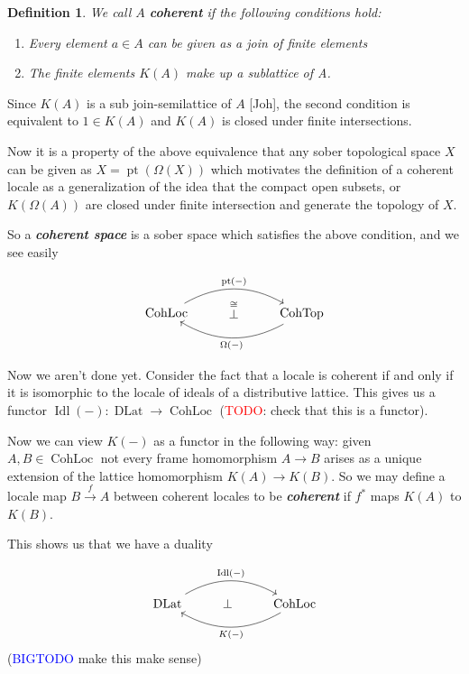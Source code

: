\documentclass[12pt,a4paper]{article}
\newtheorem{definition}{Definition}[section] %
\DeclareMathOperator{\DLat}{DLat}
\DeclareMathOperator{\CohLoc	}{CohLoc}
\DeclareMathOperator{\CohTop}{CohTop}
\DeclareMathOperator{\pt}{pt}
\DeclareMathOperator{\Idl}{Idl}
\begin{document}
\begin{definition}
	We call $A$ \textbf{coherent} if the following conditions hold: \begin{enumerate}
		\item Every element $a \in A$ can be given as a join of finite elements
		\item The finite elements $K(A)$ make up a sublattice of A. 
	\end{enumerate}

\end{definition}

Since $K(A)$ is a sub join-semilattice of $A$ [Joh], the second condition is equivalent to $1 \in K(A)$ and $K(A)$ is closed under finite intersections.

Now it is a property of the above equivalence that any sober topological space $X$ can be given as $X = \pt(\Omega(X))$ which motivates the definition of a coherent locale as a generalization of the idea that the compact open subsets, or $K(\Omega(A))$ are closed under finite intersection and generate the topology of $X$. 

So a \emph{\textbf{coherent space}} is a sober space which satisfies the above condition, and we see easily 

 \[\begin{tikzcd}
	\CohLoc & \stackrel{\cong}{\bot} & \CohTop
	\arrow["{\pt(-)}", bend left, from=1-1, to=1-3]
	\arrow["{\Omega(-)}", bend left, from=1-3, to=1-1]
\end{tikzcd}\]



Now we aren't done yet. Consider the fact that a locale is coherent if and only if it is isomorphic to the locale of ideals of a distributive lattice. This gives us a functor $\Idl(-): \DLat \to \CohLoc$ (\textcolor{red}{TODO}: check that this is a functor).

Now we can view $K(-)$ as a functor in the following way: given $A, B \in \CohLoc$ not every frame homomorphism $A \to B$ arises as a unique extension of the lattice homomorphism $K(A) \to K(B)$. So we may define a locale map $B \stackrel{f}{\to} A$ between coherent locales to be  \emph{\textbf{coherent}} if $f^*$ maps $K(A)$ to $K(B)$.

This shows us that we have a duality 

\[\begin{tikzcd}
	\DLat & \bot & \CohLoc
	\arrow["{\Idl(-)}", bend left, from=1-1, to=1-3]
	\arrow["{K(-)}", bend left, from=1-3, to=1-1]
\end{tikzcd}\](\textcolor{blue}{BIGTODO} make this make sense)
\end{document}
